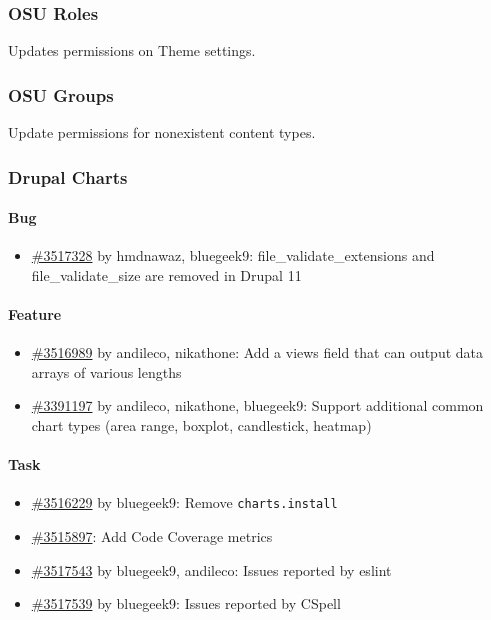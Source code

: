     \subsubsection{OSU Roles}
    Updates permissions on Theme settings.

    \subsubsection{OSU Groups}
    Update permissions for nonexistent content types.

    \subsubsection{Drupal Charts}

    \paragraph{Bug}
    \begin{itemize}
        \item \href{https://www.drupal.org/i/3517328}{\#3517328} by hmdnawaz, bluegeek9: file\_validate\_extensions and file\_validate\_size are removed in Drupal 11
    \end{itemize}

    \paragraph{Feature}
    \begin{itemize}
        \item \href{https://www.drupal.org/i/3516989}{\#3516989} by andileco, nikathone: Add a views field that can output data arrays of various lengths
        \item \href{https://www.drupal.org/i/3391197}{\#3391197} by andileco, nikathone, bluegeek9: Support additional common chart types (area range, boxplot, candlestick, heatmap)
    \end{itemize}

    \paragraph{Task}
    \begin{itemize}
        \item \href{https://www.drupal.org/i/3516229}{\#3516229} by bluegeek9: Remove \verb|charts.install|
        \item \href{https://www.drupal.org/i/3515897}{\#3515897}: Add Code Coverage metrics
        \item \href{https://www.drupal.org/i/3517543}{\#3517543} by bluegeek9, andileco: Issues reported by eslint
        \item \href{https://www.drupal.org/i/3517539}{\#3517539} by bluegeek9: Issues reported by CSpell
    \end{itemize}

